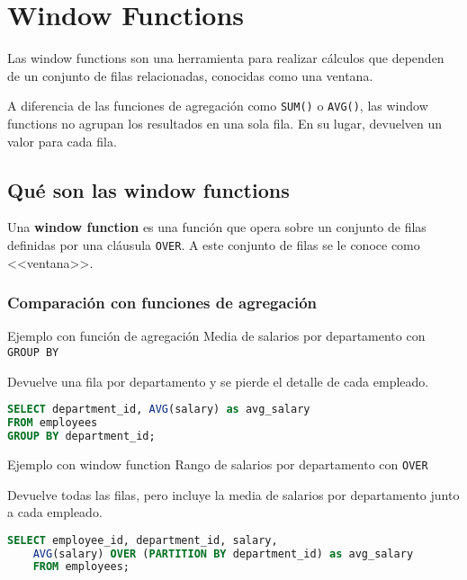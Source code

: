 \chapter{Window Functions}\label{ch:window_functions}

Las window functions son una herramienta para realizar cálculos que
dependen de un conjunto de filas relacionadas, conocidas como
una ventana.

A diferencia de las funciones de agregación como \texttt{SUM()} o
\texttt{AVG()}, las window functions no agrupan los resultados en
una sola fila. En su lugar, devuelven un valor para cada fila.

\section{Qué son las window functions}

Una \textbf{window function} es una función que opera sobre un
conjunto de filas definidas por una cláusula \texttt{OVER}. A
este conjunto de filas se le conoce como <<ventana>>.

\subsection{Comparación con funciones de agregación}

\begin{examplebox}{Ejemplo con función de agregación}
    Media de salarios por departamento con \texttt{GROUP BY}
\end{examplebox}

Devuelve una fila por departamento y se pierde el detalle de cada empleado.
\vspace{5pt}

\begin{lstlisting}[language=SQL]
SELECT department_id, AVG(salary) as avg_salary
FROM employees
GROUP BY department_id;
\end{lstlisting}


\begin{examplebox}{Ejemplo con window function}
    Rango de salarios por departamento con \texttt{OVER}
\end{examplebox}

Devuelve todas las filas, pero incluye la media de salarios por
departamento junto a cada empleado.
\vspace{5pt}

\begin{lstlisting}[language=SQL]
    SELECT employee_id, department_id, salary,
    AVG(salary) OVER (PARTITION BY department_id) as avg_salary
    FROM employees;
\end{lstlisting}



